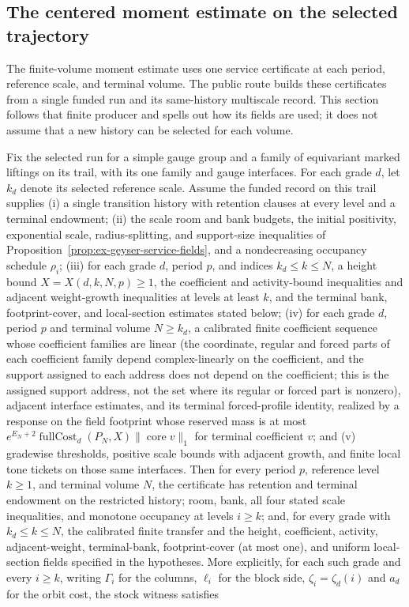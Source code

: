 \subsection{The centered moment estimate on the selected trajectory}\label{ex-centered-public-service}

The finite-volume moment estimate uses one service certificate at each period, reference scale, and terminal volume. The public route builds these certificates from a single funded run and its same-history multiscale record. This section follows that finite producer and spells out how its fields are used; it does not assume that a new history can be selected for each volume.

\begin{theorem}\label{thm:ex-selected-run-service}
Fix the selected run for a simple gauge group and a family of equivariant marked liftings on its trail, with its one family and gauge interfaces. For each grade $d$, let $k_d$ denote its selected reference scale. Assume the funded record on this trail supplies (i) a single transition history with retention clauses at every level and a terminal endowment; (ii) the scale room and bank budgets, the initial positivity, exponential scale, radius-splitting, and support-size inequalities of Proposition~\ref{prop:ex-geyser-service-fields}, and a nondecreasing occupancy schedule $\rho_i$; (iii) for each grade $d$, period $p$, and indices $k_d\leq k\leq N$, a height bound $X=X(d,k,N,p)\geq1$, the coefficient and activity-bound inequalities and adjacent weight-growth inequalities at levels at least $k$, and the terminal bank, footprint-cover, and local-section estimates stated below; (iv) for each grade $d$, period $p$ and terminal volume $N\geq k_d$, a calibrated finite coefficient sequence whose coefficient families are linear (the coordinate, regular and forced parts of each coefficient family depend complex-linearly on the coefficient, and the support assigned to each address does not depend on the coefficient; this is the assigned support address, not the set where its regular or forced part is nonzero), adjacent interface estimates, and its terminal forced-profile identity, realized by a response
on the field footprint whose reserved mass is at most
$e^{E_N+2}\operatorname{fullCost}_d(P_N,X)\|\operatorname{core}v\|_1$
for terminal coefficient $v$; and (v) gradewise thresholds, positive scale bounds with adjacent growth, and finite local tone tickets on those same interfaces. Then for every period $p$, reference level $k\geq1$, and terminal volume $N$, the certificate has retention and terminal endowment on the restricted history; room, bank, all four stated scale inequalities, and monotone occupancy at levels $i\geq k$; and, for every grade with $k_d\leq k\leq N$, the calibrated finite transfer and the height, coefficient, activity, adjacent-weight, terminal-bank, footprint-cover (at most one), and uniform local-section fields specified in the hypotheses. More explicitly, for each such grade and every $i\geq k$, writing $\Gamma_i$ for the columns, $\ell_i$ for the block side, $\zeta_i=\zeta_d(i)$ and $a_d$ for the orbit cost, the stock witness satisfies

\end{theorem}
